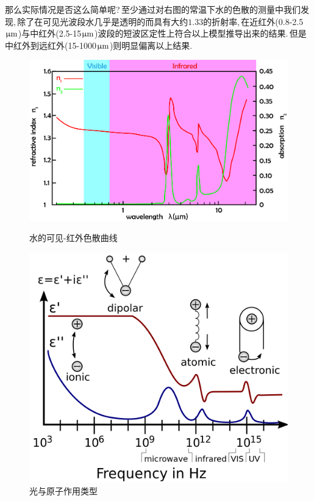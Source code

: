那么实际情况是否这么简单呢?\,至少通过对右图的常温下水的色散的测量中我们发现,\,除了在可见光波段水几乎是透明的而具有大约$1.33$的折射率,\,在近红外(0.8-2.5${\rm \upmu m}$)与中红外(2.5-15${\rm \upmu m}$)波段的短波区定性上符合以上模型推导出来的结果.\,但是中红外到远红外(15-1000${\rm \upmu m}$)则明显偏离以上结果.
\begin{figure}[H]
\centering
\begin{minipage}{0.53\textwidth}
\includegraphics[width=\textwidth]{image/18-1-3.png}
\caption{水的可见-红外色散曲线}
\end{minipage}
\qquad
\begin{minipage}{0.38\textwidth}
\includegraphics[width=\textwidth]{image/18-1-4.png}
\caption{光与原子作用类型}
\end{minipage}
\end{figure}

